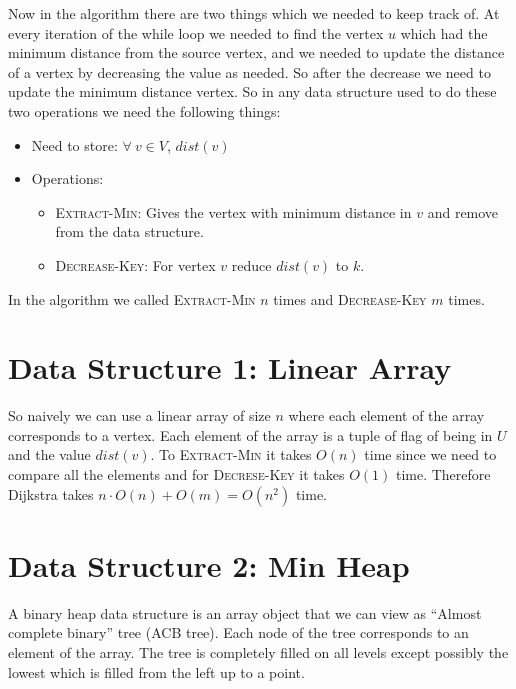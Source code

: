 Now in the algorithm there are two things which we needed to keep track of. At every iteration of the while loop we needed to find the vertex $u$ which had the minimum distance from the source vertex, and we needed to update the distance of a vertex by decreasing the value as needed. So after the decrease we need to update the minimum distance vertex. So in any data structure used to do these two operations we need the following things:\begin{itemize}[label=$\bullet$]
	\item Need to store: $\forall\ v\in V$, $dist(v)$
	\item Operations: \begin{itemize}
		      \item \textsc{Extract-Min}: Gives the vertex with minimum distance in $v$ and remove from the data structure.
		      \item \textsc{Decrease-Key}: For vertex $v$ reduce $dist(v)$ to $k$.
	      \end{itemize}
\end{itemize}\parinf

In the algorithm we called \textsc{Extract-Min} $n$ times and \textsc{Decrease-Key} $m$ times.\parinn

\section{Data Structure 1: Linear Array}
So naively we can use a linear array of size $n$ where each element of the array corresponds to a vertex. Each element of the array is a tuple of flag of being in $U$ and the value $dist(v)$. To \textsc{Extract-Min} it takes $O(n)$ time since we need to compare all the elements and for \textsc{Decrese-Key} it takes $O(1)$ time. Therefore Dijkstra takes $n\cdot O(n)+O(m)=O(n^2)$ time.

\section{Data Structure 2: Min Heap}
A binary heap data structure is an array object that we can view as ``Almost complete binary'' tree (ACB tree). Each node of the tree corresponds to an element of the array. The tree is completely filled on all levels except possibly the lowest which is filled from the left up to a point.


